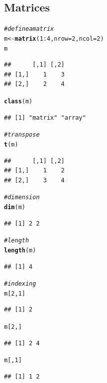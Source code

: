 \documentclass[11pt]{article}\usepackage[]{graphicx}\usepackage[]{color}
\makeatletter
\newcommand{\hlnum}[1]{\textcolor[rgb]{0.686,0.059,0.569}{#1}}%
\newcommand{\hlcom}[1]{\textcolor[rgb]{0.678,0.584,0.686}{\textit{#1}}}%
\newcommand{\hlopt}[1]{\textcolor[rgb]{0,0,0}{#1}}%
\newcommand{\hlstd}[1]{\textcolor[rgb]{0.345,0.345,0.345}{#1}}%
\newcommand{\hlkwb}[1]{\textcolor[rgb]{0.69,0.353,0.396}{#1}}%
\newcommand{\hlkwc}[1]{\textcolor[rgb]{0.333,0.667,0.333}{#1}}%
\newcommand{\hlkwd}[1]{\textcolor[rgb]{0.737,0.353,0.396}{\textbf{#1}}}%
\newenvironment{kframe}{%
 \def\at@end@of@kframe{}%
 \ifinner\ifhmode%
  \def\at@end@of@kframe{\end{minipage}}%
  \begin{minipage}{\columnwidth}%
 \fi\fi%
 \def\FrameCommand##1{\hskip\@totalleftmargin \hskip-\fboxsep
 \colorbox{shadecolor}{##1}\hskip-\fboxsep
     \hskip-\linewidth \hskip-\@totalleftmargin \hskip\columnwidth}%
 \MakeFramed {\advance\hsize-\width
   \@totalleftmargin\z@ \linewidth\hsize
   \@setminipage}}%
 {\par\unskip\endMakeFramed%
 \at@end@of@kframe}
\newenvironment{knitrout}{}{} %
\makeatother
\begin{document}
\subsection{Matrices}

\begin{knitrout}
\color{fgcolor}\begin{kframe}
\begin{alltt}
\hlcom{# define a matrix}
\hlstd{m} \hlkwb{<-} \hlkwd{matrix}\hlstd{(}\hlnum{1}\hlopt{:}\hlnum{4}\hlstd{,} \hlkwc{nrow} \hlstd{=} \hlnum{2}\hlstd{,} \hlkwc{ncol} \hlstd{=} \hlnum{2}\hlstd{)}
\hlstd{m}
\end{alltt}
\begin{verbatim}
##      [,1] [,2]
## [1,]    1    3
## [2,]    2    4
\end{verbatim}
\begin{alltt}
\hlkwd{class}\hlstd{(m)}
\end{alltt}
\begin{verbatim}
## [1] "matrix" "array"
\end{verbatim}
\begin{alltt}
\hlcom{# transpose}
\hlkwd{t}\hlstd{(m)}
\end{alltt}
\begin{verbatim}
##      [,1] [,2]
## [1,]    1    2
## [2,]    3    4
\end{verbatim}
\begin{alltt}
\hlcom{# dimension}
\hlkwd{dim}\hlstd{(m)}
\end{alltt}
\begin{verbatim}
## [1] 2 2
\end{verbatim}
\begin{alltt}
\hlcom{# length}
\hlkwd{length}\hlstd{(m)}
\end{alltt}
\begin{verbatim}
## [1] 4
\end{verbatim}
\begin{alltt}
\hlcom{# indexing}
\hlstd{m[}\hlnum{2}\hlstd{,}\hlnum{1}\hlstd{]}
\end{alltt}
\begin{verbatim}
## [1] 2
\end{verbatim}
\begin{alltt}
\hlstd{m[}\hlnum{2}\hlstd{,]}
\end{alltt}
\begin{verbatim}
## [1] 2 4
\end{verbatim}
\begin{alltt}
\hlstd{m[,}\hlnum{1}\hlstd{]}
\end{alltt}
\begin{verbatim}
## [1] 1 2
\end{verbatim}
\end{kframe}
\end{knitrout}
\end{document}
